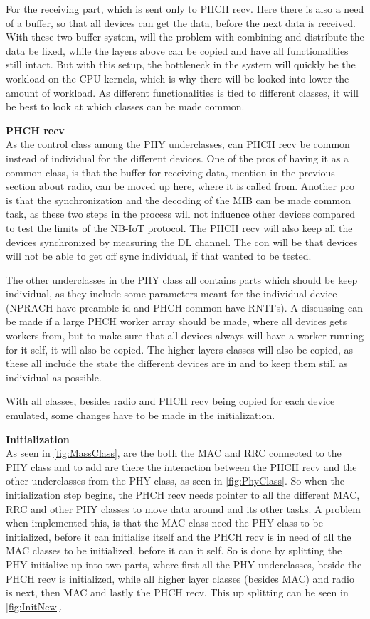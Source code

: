 For the receiving part, which is sent only to PHCH recv. Here there is also a need of a buffer, so that all devices can get the data, before the next data is received. 
With these two buffer system, will the problem with combining and distribute the data be fixed, while the layers above can be copied and have all functionalities still intact. But with this setup, the bottleneck in the system will quickly be the workload on the CPU kernels, which is why there will be looked into lower the amount of workload. As different functionalities is tied to different classes, it will be best to look at which classes can be made common.

\textbf{PHCH recv}\\
As the control class among the PHY underclasses, can PHCH recv be common instead of individual for the different devices. One of the pros of having it as a common class, is that the buffer for receiving data, mention in the previous section about radio, can be moved up here, where it is called from. Another pro is that the synchronization and the decoding of the MIB can be made common task, as these two steps in the process will not influence other devices compared to test the limits of the NB-IoT protocol. The PHCH recv will also keep all the devices synchronized by measuring the DL channel. The con will be that devices will not be able to get off sync individual, if that wanted to be tested.

The other underclasses in the PHY class all contains parts which should be keep individual, as they include some parameters meant for the individual device (NPRACH have preamble id and PHCH common have RNTI's). A discussing can be made if a large PHCH worker array should be made, where all devices gets workers from, but to make sure that all devices always will have a worker running for it self, it will also be copied. The higher layers classes will also be copied, as these all include the state the different devices are in and to keep them still as individual as possible. 

With all classes, besides radio and PHCH recv being copied for each device emulated, some changes have to be made in the initialization.

\textbf{Initialization}\\
As seen in \autoref{fig:MassClass}, are the both the MAC and RRC connected to the PHY class and to add are there the interaction between the PHCH recv and the other underclasses from the PHY class, as seen in \autoref{fig:PhyClass}. So when the initialization step begins, the PHCH recv needs pointer to all the different MAC, RRC and other PHY classes to move data around and its other tasks. A problem when implemented this, is that the MAC class need the PHY class to be initialized, before it can initialize itself and the PHCH recv is in need of all the MAC classes to be initialized, before it can it self. So is done by splitting the PHY initialize up into two parts, where first all the PHY underclasses, beside the PHCH recv is initialized, while all higher layer classes (besides MAC) and radio is next, then MAC and lastly the PHCH recv. This up splitting can be seen in \autoref{fig:InitNew}.

